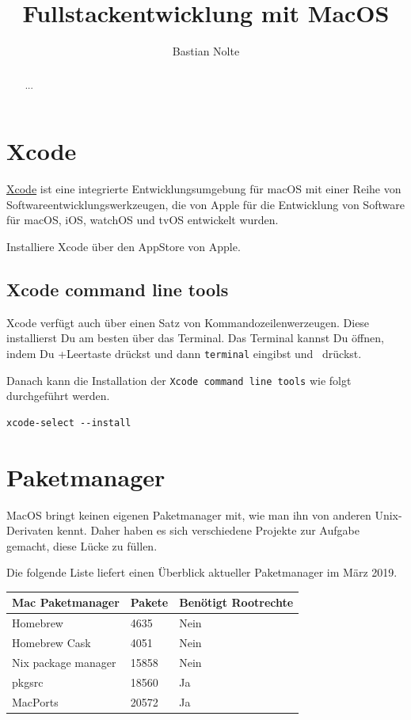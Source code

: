 \documentclass[]{article}
\title{Fullstackentwicklung mit MacOS}
\author{Bastian Nolte}
\newcommand{\code}[1]{\texttt{#1}}
\begin{document}
\maketitle

\begin{abstract}
...
\end{abstract}

\section{Xcode}
\href{https://developer.apple.com/xcode/}{Xcode} ist eine integrierte Entwicklungsumgebung für macOS mit einer Reihe von Softwareentwicklungswerkzeugen, die von Apple für die Entwicklung von Software für macOS, iOS, watchOS und tvOS entwickelt wurden.

Installiere Xcode über den AppStore von Apple.
\subsection{Xcode command line tools}
Xcode verfügt auch über einen Satz von Kommandozeilenwerzeugen. Diese installierst Du am besten über das Terminal. Das Terminal kannst Du öffnen, indem Du \cmdkey+Leertaste drückst und dann \code{terminal} eingibst und \returnkey\, drückst.

Danach kann die Installation der \code{Xcode  command line tools} wie folgt durchgeführt werden.
\begin{verbatim}
xcode-select --install
\end{verbatim}

\section{Paketmanager}
MacOS bringt keinen eigenen Paketmanager mit, wie man ihn von anderen Unix-Derivaten kennt. Daher haben es sich verschiedene Projekte zur Aufgabe gemacht, diese Lücke zu füllen.

Die folgende Liste liefert einen Überblick aktueller Paketmanager im März 2019.

\begin{tabular}[t]{lll}
	\toprule
	Mac Paketmanager & Pakete & Benötigt Rootrechte \\
	\midrule
	Homebrew & 4635 & Nein \\
	Homebrew Cask & 4051 & Nein \\
	Nix package manager & 15858 & Nein \\
	pkgsrc & 18560 & Ja \\
	MacPorts & 20572 & Ja \\
	\bottomrule
\end{tabular}
\end{document}
